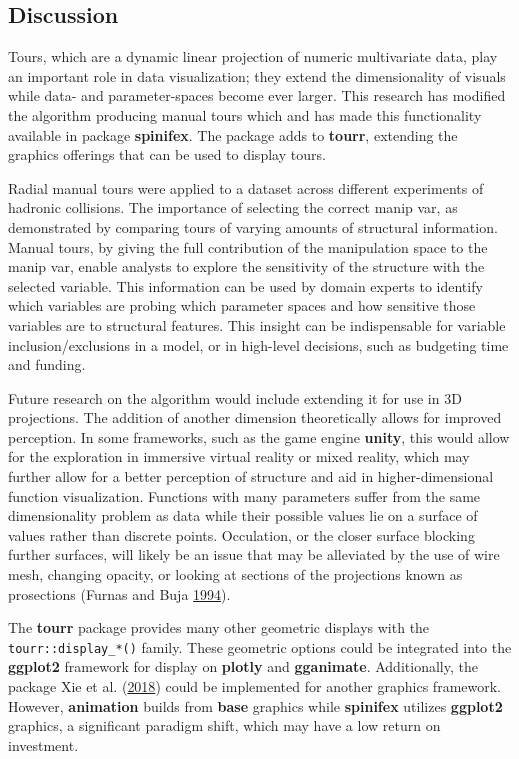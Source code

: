 \hypertarget{sec:discussion}{%
\subsection{Discussion}\label{sec:discussion}}

Tours, which are a dynamic linear projection of numeric multivariate
data, play an important role in data visualization; they extend the
dimensionality of visuals while data- and parameter-spaces become ever
larger. This research has modified the algorithm producing manual tours
which and has made this functionality available in package
\textbf{spinifex}. The package adds to \textbf{tourr}, extending the
graphics offerings that can be used to display tours.

Radial manual tours were applied to a dataset across different
experiments of hadronic collisions. The importance of selecting the
correct manip var, as demonstrated by comparing tours of varying amounts
of structural information. Manual tours, by giving the full contribution
of the manipulation space to the manip var, enable analysts to explore
the sensitivity of the structure with the selected variable. This
information can be used by domain experts to identify which variables
are probing which parameter spaces and how sensitive those variables are
to structural features. This insight can be indispensable for variable
inclusion/exclusions in a model, or in high-level decisions, such as
budgeting time and funding.

Future research on the algorithm would include extending it for use in
3D projections. The addition of another dimension theoretically allows
for improved perception. In some frameworks, such as the game engine
\textbf{unity}, this would allow for the exploration in immersive
virtual reality or mixed reality, which may further allow for a better
perception of structure and aid in higher-dimensional function
visualization. Functions with many parameters suffer from the same
dimensionality problem as data while their possible values lie on a
surface of values rather than discrete points. Occulation, or the closer
surface blocking further surfaces, will likely be an issue that may be
alleviated by the use of wire mesh, changing opacity, or looking at
sections of the projections known as prosections (Furnas and Buja
\protect\hyperlink{ref-furnas_prosection_1994}{1994}).

The \textbf{tourr} package provides many other geometric displays with
the \texttt{tourr::display\_*()} family. These geometric options could
be integrated into the \textbf{ggplot2} framework for display on
\textbf{plotly} and \textbf{gganimate}. Additionally, the
 package Xie et al.
(\protect\hyperlink{ref-xie_animation:_2018}{2018}) could be implemented
for another graphics framework. However, \textbf{animation} builds from
\textbf{base} graphics while \textbf{spinifex} utilizes \textbf{ggplot2}
graphics, a significant paradigm shift, which may have a low return on
investment.

